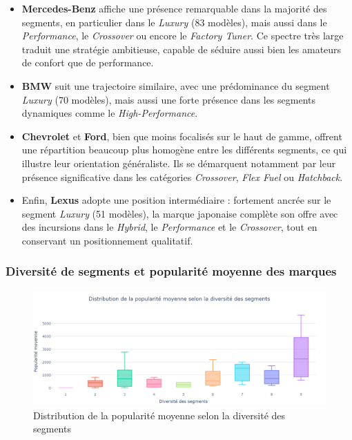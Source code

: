 \documentclass[12pt]{report}
\begin{document}
\begin{itemize}
    \item \textbf{Mercedes-Benz} affiche une présence remarquable dans la majorité des segments, en particulier dans le \textit{Luxury} (83 modèles), mais aussi dans le \textit{Performance}, le \textit{Crossover} ou encore le \textit{Factory Tuner}. Ce spectre très large traduit une stratégie ambitieuse, capable de séduire aussi bien les amateurs de confort que de performance.
    
    \item \textbf{BMW} suit une trajectoire similaire, avec une prédominance du segment \textit{Luxury} (70 modèles), mais aussi une forte présence dans les segments dynamiques comme le \textit{High-Performance}.

    \item \textbf{Chevrolet} et \textbf{Ford}, bien que moins focalisés sur le haut de gamme, offrent une répartition beaucoup plus homogène entre les différents segments, ce qui illustre leur orientation généraliste. Ils se démarquent notamment par leur présence significative dans les catégories \textit{Crossover}, \textit{Flex Fuel} ou \textit{Hatchback}.

    \item Enfin, \textbf{Lexus} adopte une position intermédiaire : fortement ancrée sur le segment \textit{Luxury} (51 modèles), la marque japonaise complète son offre avec des incursions dans le \textit{Hybrid}, le \textit{Performance} et le \textit{Crossover}, tout en conservant un positionnement qualitatif.
\end{itemize}

\subsubsection{Diversité de segments et popularité moyenne des marques}

\begin{figure}[H]
    \centering
    \includegraphics[width=1\textwidth]{Section_pop.png}
    \caption{Distribution de la popularité moyenne selon la diversité des segments}
    \label{fig:section-pop}
\end{figure}
\end{document}
